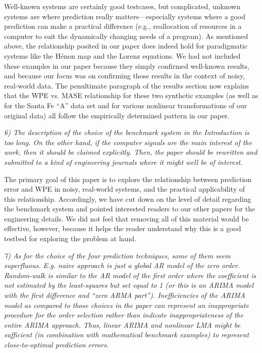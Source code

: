 \documentclass[12pt]{article}
\begin{document}
Well-known systems are certainly good testcases, but complicated,
unknown systems are where prediction really matters---especially
systems where a good prediction can make a practical difference (e.g.,
reallocation of resources in a computer to suit the dynamically
changing needs of a program).  As mentioned above, the relationship
posited in our paper does indeed hold for paradigmatic systems like
the H\'{e}non map and the Lorenz equations.  We had not included these
examples in our paper because they simply confirmed well-known
results, and because our focus was on confirming those results in the
context of noisy, real-world data.  The penultimate paragraph of the
results section now explains that the WPE vs. MASE relationship for
these two synthetic examples (as well as for the Santa Fe ``A'' data
set and for various nonlinear transformations of our original data)
all follow the empirically determined pattern in our paper.

\smallskip

\emph{6) The description of the choice of the benchmark system in the
  Introduction is too long. On the other hand, if the computer signals
  are the main interest of the work, then it should be claimed
  explicitly. Then, the paper should be rewritten and submitted to a
  kind of engineering journals where it might well be of interest.}

The primary goal of this paper is to explore the relationship between
prediction error and WPE in noisy, real-world systems, and the
practical applicability of this relationship.  Accordingly, we have
cut down on the level of detail regarding the benchmark system and
pointed interested readers to our other papers for the engineering
details.  We did not feel that removing all of this material would
be effective, however, because it helps the reader understand why
this is a good testbed for exploring the problem at hand.

\smallskip

\emph{7) As for the choice of the four prediction techniques, some of
  them seem superfluous. E.g. naive approach is just a global AR model
  of the zero order.  Random-walk is similar to the AR model of the
  first order where the coefficient is not estimated by the
  least-squares but set equal to 1 (or this is an ARIMA model with the
  first difference and ``zero ARMA part''). Inefficiencies of the
  ARIMA model as compared to those choices in the paper can represent
  an inappropriate procedure for the order selection rather than
  indicate inappropriateness of the entire ARIMA approach. Thus,
  linear ARIMA and nonlinear LMA might be sufficient (in combination
  with mathematical benchmark examples) to represent close-to-optimal
  prediction errors.}
\end{document}
